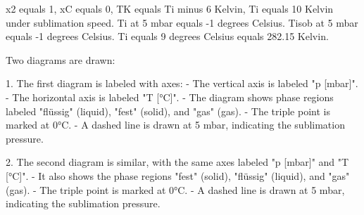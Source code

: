 x2 equals 1, xC equals 0, TK equals Ti minus 6 Kelvin, Ti equals 10 Kelvin under sublimation speed.  
Ti at 5 mbar equals -1 degrees Celsius.  
Tisob at 5 mbar equals -1 degrees Celsius.  
Ti equals 9 degrees Celsius equals 282.15 Kelvin.  

Two diagrams are drawn:  

1. The first diagram is labeled with axes:  
   - The vertical axis is labeled "p [mbar]".  
   - The horizontal axis is labeled "T [°C]".  
   - The diagram shows phase regions labeled "flüssig" (liquid), "fest" (solid), and "gas" (gas).  
   - The triple point is marked at 0°C.  
   - A dashed line is drawn at 5 mbar, indicating the sublimation pressure.  

2. The second diagram is similar, with the same axes labeled "p [mbar]" and "T [°C]".  
   - It also shows the phase regions "fest" (solid), "flüssig" (liquid), and "gas" (gas).  
   - The triple point is marked at 0°C.  
   - A dashed line is drawn at 5 mbar, indicating the sublimation pressure.